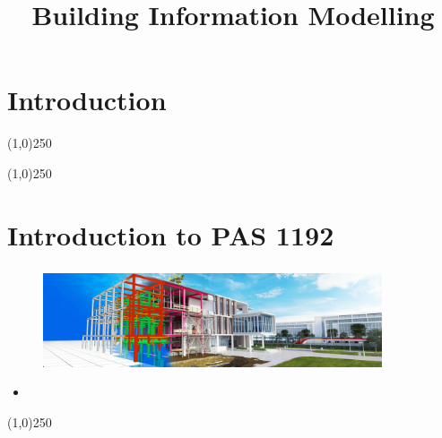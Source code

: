 



%
\title[Building Information Modelling]{Building Information Modelling}



%
\usetikzlibrary{arrows}



\newpage




\thispagestyle{empty}
\tableofcontents
\newpage
\section{Introduction}


\begin{frame}
\titlepage
\end{frame}\begin{center}\line(1,0){250}\end{center}
%
%
\begin{center}\line(1,0){250}\end{center}




\section{Introduction to PAS 1192}

\begin{frame}
\frametitle{}
\begin{figure}
	\centering
	\includegraphics[width=10cm]{./images/bim-banner-bg-1.jpg}
	\caption[]{}
	\label{fig:}
\end{figure}
\begin{itemize}
	\item 
\end{itemize}
\end{frame}
\begin{center}\line(1,0){250}\end{center}






